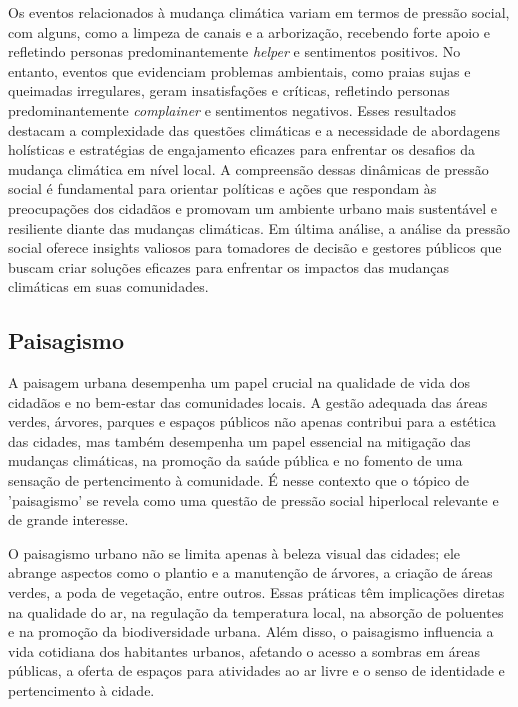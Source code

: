 Os eventos relacionados à mudança climática variam em termos de pressão social, com alguns, como a limpeza de canais e a arborização, recebendo forte apoio e refletindo personas predominantemente \textit{helper} e sentimentos positivos. No entanto, eventos que evidenciam problemas ambientais, como praias sujas e queimadas irregulares, geram insatisfações e críticas, refletindo personas predominantemente \textit{complainer} e sentimentos negativos. Esses resultados destacam a complexidade das questões climáticas e a necessidade de abordagens holísticas e estratégias de engajamento eficazes para enfrentar os desafios da mudança climática em nível local. A compreensão dessas dinâmicas de pressão social é fundamental para orientar políticas e ações que respondam às preocupações dos cidadãos e promovam um ambiente urbano mais sustentável e resiliente diante das mudanças climáticas. Em última análise, a análise da pressão social oferece insights valiosos para tomadores de decisão e gestores públicos que buscam criar soluções eficazes para enfrentar os impactos das mudanças climáticas em suas comunidades.

\subsection{Paisagismo}

A paisagem urbana desempenha um papel crucial na qualidade de vida dos cidadãos e no bem-estar das comunidades locais. A gestão adequada das áreas verdes, árvores, parques e espaços públicos não apenas contribui para a estética das cidades, mas também desempenha um papel essencial na mitigação das mudanças climáticas, na promoção da saúde pública e no fomento de uma sensação de pertencimento à comunidade. É nesse contexto que o tópico de 'paisagismo' se revela como uma questão de pressão social hiperlocal relevante e de grande interesse.

O paisagismo urbano não se limita apenas à beleza visual das cidades; ele abrange aspectos como o plantio e a manutenção de árvores, a criação de áreas verdes, a poda de vegetação, entre outros. Essas práticas têm implicações diretas na qualidade do ar, na regulação da temperatura local, na absorção de poluentes e na promoção da biodiversidade urbana. Além disso, o paisagismo influencia a vida cotidiana dos habitantes urbanos, afetando o acesso a sombras em áreas públicas, a oferta de espaços para atividades ao ar livre e o senso de identidade e pertencimento à cidade.

